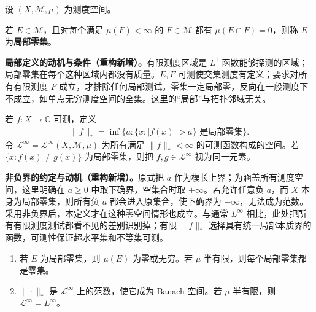 \documentclass[../../main.tex]{subfiles}
\begin{document}
\begin{exercise}\label{exercise:ch06-linfty-semifinite-23}
设 $(X,\mathscr M,\mu)$ 为测度空间。
\begin{definition*}[局部零集]\label{definition:ch06-locally-null}
若 $E\in\mathscr M$，且对每个满足 $\mu(F)<\infty$ 的 $F\in\mathscr M$ 都有 $\mu(E\cap F)=0$，则称 $E$ 为\textbf{局部零集}。
\end{definition*}
\begin{remark}
\textbf{局部定义的动机与条件（重构新增）。}有限测度区域是 $L^1$ 函数能够探测的区域；局部零集在每个这种区域内都没有质量。$E,F$ 可测使交集测度有定义；要求对所有有限测度 $F$ 成立，才排除任何局部测试。零集一定局部零，反向在一般测度下不成立，如单点无穷测度空间的全集。这里的“局部”与拓扑邻域无关。
\end{remark}
\begin{definition*}[按局部零集识别的有界函数空间]\label{definition:ch06-local-linfty}
若 $f:X\to\mathbb C$ 可测，定义
\begin{align*}
\|f\|_* =\inf\{a:\{x:|f(x)|>a\}\text{ 是局部零集}\}.
\end{align*}
令 $\mathcal L^\infty=\mathcal L^\infty(X,\mathscr M,\mu)$ 为所有满足 $\|f\|_*<\infty$ 的可测函数构成的空间。若 $\{x:f(x)\ne g(x)\}$ 为局部零集，则把 $f,g\in\mathcal L^\infty$ 视为同一元素。
\end{definition*}
\begin{remark}
\textbf{非负界的约定与动机（重构新增）。}原式把 $a$ 作为模长上界；为涵盖所有测度空间，这里明确在 $a\geqslant0$ 中取下确界，空集合时取 $+\infty$。若允许任意负 $a$，而 $X$ 本身为局部零集，则所有负 $a$ 都会进入原集合，使下确界为 $-\infty$，无法成为范数。采用非负界后，本定义才在这种零空间情形也成立。与通常 $L^\infty$ 相比，此处把所有有限测度测试都看不见的差别识别掉；有限 $\|f\|_*$ 选择具有统一局部本质界的函数，可测性保证超水平集和不等集可测。
\end{remark}
\begin{enumerate}
\item\label{item:ch06-locally-null-measure} 若 $E$ 为局部零集，则 $\mu(E)$ 为零或无穷。若 $\mu$ 半有限，则每个局部零集都是零集。
\item\label{item:ch06-local-linfty-banach} $\|\cdot\|_*$ 是 $\mathcal L^\infty$ 上的范数，使它成为 Banach 空间。若 $\mu$ 半有限，则 $\mathcal L^\infty=L^\infty$。
\end{enumerate}
\end{exercise}
\end{document}

